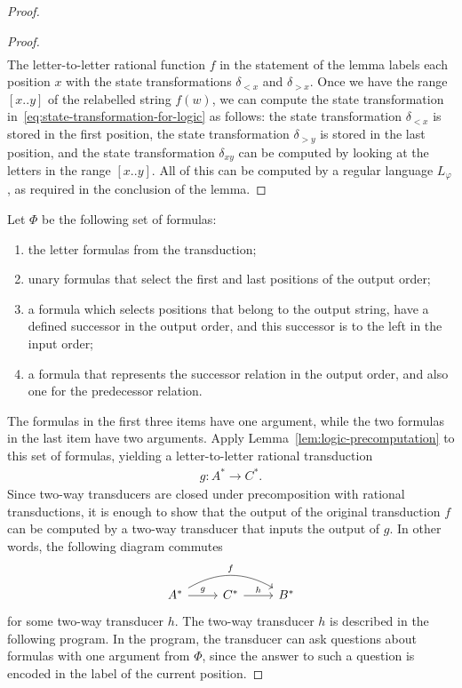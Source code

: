\begin{proof}
\begin{proof}
\begin{align*}
        \end{align*}
        The letter-to-letter rational function $f$ in the statement of the lemma labels each position $x$ with the state transformations $\delta_{<x}$ and $\delta_{>x}$. Once we have the range $[x..y]$ of the relabelled string $f(w)$, we can compute the state transformation in~\eqref{eq:state-transformation-for-logic} as follows: the state transformation $\delta_{<x}$ is stored in the first position, the state transformation $\delta_{>y}$ is stored in the last position, and the state transformation $\delta_{xy}$ can be computed by looking at the letters in the range $[x..y]$. All of this can be computed by a regular language $L_\varphi$, as required in the conclusion of the lemma.
    \end{proof}

    Let $\Phi$ be the following set of formulas: 
    \begin{enumerate}
        \item the letter formulas from the transduction;
         \item unary formulas that select the first and last positions of the output order;
        \item a formula which selects positions that  belong to the output string, have a defined successor in the output order, and this  successor is to the left in the input order;
          \item a formula that represents the successor relation in the output order, and also one for the predecessor relation.
    \end{enumerate}
    The formulas in the first three items have one argument, while the two formulas in the last item have two arguments. Apply Lemma~\ref{lem:logic-precomputation} to this set of formulas, yielding a letter-to-letter rational transduction  
    \begin{align*}
     g : A^* \to C^*.
    \end{align*}
    Since two-way transducers are closed under precomposition with rational transductions, it is enough to show that the output of the original \mso transduction $f$ can be computed by a two-way transducer that inputs the output of $g$. In other words, the following diagram commutes
    \[
    \begin{tikzcd}
    A^* 
    \ar[r,"g"] 
    \ar[rr,"f",bend left]
    & 
    C^*
    \ar[r,"h"]
    & 
    B^*
    \end{tikzcd}
    \]
    for some two-way transducer $h$. The two-way transducer $h$ is described in the following program. In the program, the transducer can ask questions about formulas with one argument from $\Phi$, since the answer to such a question is encoded in the label of the current position. 

\end{proof}
